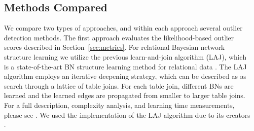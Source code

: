 \documentclass[conference]{IEEEtran}
\begin{document}
					\begin{table}
							\caption{Outlier/normal Objects in Real-World Datasets. }
							\label{MetricComputation}
						\centering
						
						\end{table}
						
%					
%					
																
						\subsection{Methods Compared}
						\label{sec:methods}
						We compare two types of approaches, and within each approach several outlier detection methods. The first approach evaluates the likelihood-based outlier scores described in Section~\ref{sec:metrics}. For relational Bayesian network structure learning we utilize the previous learn-and-join algorithm (LAJ), which is
				a state-of-the-art BN structure learning method for relational data \cite{Schulte2012}. The LAJ algorithm employs an iterative deepening strategy, which can be described as as search through a lattice of table joins. For each table join, different BNs are learned and the learned edges are propagated from smaller to larger table joins. 	For a full description, complexity analysis, and learning time measurements, please see \cite{Schulte2012}. 	We used the implementation of the LAJ algorithm due to its creators \cite{bib:jbnsite}. 
					
\end{document}
